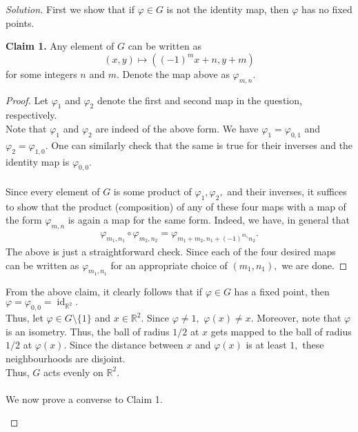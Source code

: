 \documentclass[12pt]{article}
\theoremstyle{definition}
\numberwithin{thm}{section}
\newcommand{\id}{\operatorname{id}}
\newenvironment{blockquote}
{\begin{mdframed}[skipabove=0pt, skipbelow=0pt, innertopmargin=4pt, innerbottommargin=4pt, bottomline=false,topline=false,rightline=false, linewidth=2pt]}
{\end{mdframed}}
\newenvironment{soln}{\begin{proof}[Solution]}{\end{proof}}
\begin{document}
\begin{soln}
	First we show that if $\varphi \in G$ is not the identity map, then $\varphi$ has no fixed points.\\
	\begin{blockquote}
		\textbf{Claim 1.} Any element of $G$ can be written as
		\begin{equation*} 
			(x, y) \mapsto ((-1)^mx + n, y + m)
		\end{equation*}
		for some integers $n$ and $m.$ Denote the map above as $\varphi_{m, n}.$
		\begin{proof} 
			Let $\varphi_1$ and $\varphi_2$ denote the first and second map in the question, respectively.\\
			Note that $\varphi_1$ and $\varphi_2$ are indeed of the above form. We have $\varphi_1 = \varphi_{0, 1}$ and $\varphi_2 = \varphi_{1, 0}.$ One can similarly check that the same is true for their inverses and the identity map is $\varphi_{0, 0}.$ \\~\\
			Since every element of $G$ is some product of $\varphi_1, \varphi_2,$ and their inverses, it suffices to show that the product (composition) of any of these four maps with a map of the form $\varphi_{m, n}$ is again a map for the same form. Indeed, we have, in general that
			\begin{align*} 
				\varphi_{m_1, n_1}\circ\varphi_{m_2, n_2} = \varphi_{m_1 + m_2, n_1 + (-1)^{m_1}n_2}.
			\end{align*}
			The above is just a straightforward check. Since each of the four desired maps can be written as $\varphi_{m_1, n_1}$ for an appropriate choice of $(m_1, n_1),$ we are done.
		\end{proof}
	\end{blockquote}
		From the above claim, it clearly follows that if $\varphi \in G$ has a fixed point, then $\varphi = \varphi_{0, 0} = \id_{\mathbb{R}^2}.$ \\
		Thus, let $\varphi \in G\setminus\{1\}$ and $x \in \mathbb{R}^2.$ Since $\varphi \neq 1,$ $\varphi(x) \neq x.$ Moreover, note that $\varphi$ is an isometry. Thus, the ball of radius $1/2$ at $x$ gets mapped to the ball of radius $1/2$ at $\varphi(x).$ Since the distance between $x$ and $\varphi(x)$ is at least $1,$ these neighbourhoods are disjoint.\\
		Thus, $G$ acts evenly on $\mathbb{R}^2.$\\~\\
		We now prove a converse to Claim 1.
		\begin{blockquote}

\end{blockquote}
\end{soln}
\end{document}
